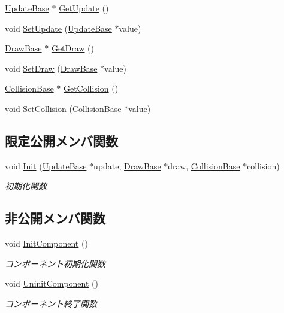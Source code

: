 \begin{DoxyCompactItemize}
\item 
\mbox{\hyperlink{class_update_base}{Update\+Base}} $\ast$ \mbox{\hyperlink{class_game_object_base_a177985be1be1252df6588fa29f2c7f41}{Get\+Update}} ()
\item 
void \mbox{\hyperlink{class_game_object_base_a71704e8310b3183f3f88869f8fd27d08}{Set\+Update}} (\mbox{\hyperlink{class_update_base}{Update\+Base}} $\ast$value)
\item 
\mbox{\hyperlink{class_draw_base}{Draw\+Base}} $\ast$ \mbox{\hyperlink{class_game_object_base_acb893b1827cb7fbb27f0caf6a8e0fb88}{Get\+Draw}} ()
\item 
void \mbox{\hyperlink{class_game_object_base_ab548b4208b8da2af6e3abb533ea53da9}{Set\+Draw}} (\mbox{\hyperlink{class_draw_base}{Draw\+Base}} $\ast$value)
\item 
\mbox{\hyperlink{class_collision_base}{Collision\+Base}} $\ast$ \mbox{\hyperlink{class_game_object_base_a8158138ea811db49445845d8aaacaf3a}{Get\+Collision}} ()
\item 
void \mbox{\hyperlink{class_game_object_base_a4aeb0212f5a390570d050bfef51b7818}{Set\+Collision}} (\mbox{\hyperlink{class_collision_base}{Collision\+Base}} $\ast$value)
\end{DoxyCompactItemize}
\subsection*{限定公開メンバ関数}
\begin{DoxyCompactItemize}
\item 
void \mbox{\hyperlink{class_game_object_base_aca14cf5d66f945347653c4965876e75b}{Init}} (\mbox{\hyperlink{class_update_base}{Update\+Base}} $\ast$update, \mbox{\hyperlink{class_draw_base}{Draw\+Base}} $\ast$draw, \mbox{\hyperlink{class_collision_base}{Collision\+Base}} $\ast$collision)
\begin{DoxyCompactList}\small\item\em 初期化関数 \end{DoxyCompactList}\end{DoxyCompactItemize}
\subsection*{非公開メンバ関数}
\begin{DoxyCompactItemize}
\item 
void \mbox{\hyperlink{class_game_object_base_a5f4d4e3d23603d8e32ddb220a53039a6}{Init\+Component}} ()
\begin{DoxyCompactList}\small\item\em コンポーネント初期化関数 \end{DoxyCompactList}\item 
void \mbox{\hyperlink{class_game_object_base_aff8e4f486435f5d921c186b0824e8a0e}{Uninit\+Component}} ()
\begin{DoxyCompactList}\small\item\em コンポーネント終了関数 \end{DoxyCompactList}\end{DoxyCompactItemize}
